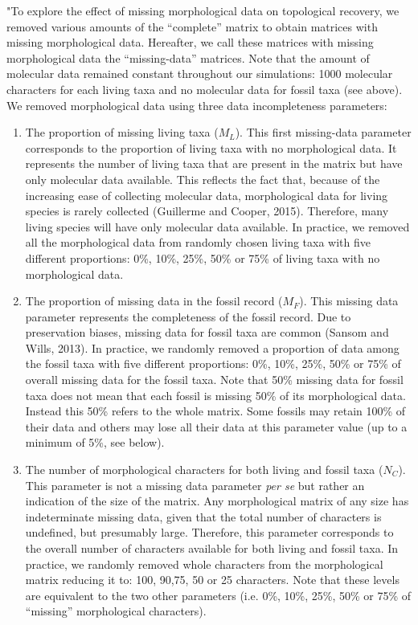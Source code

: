 \documentclass[12pt,letterpaper]{article}
\begin{document}
\begin{enumerate}
"To explore the effect of missing morphological data on topological recovery, we removed various amounts of the ``complete'' matrix to obtain matrices with missing morphological data.
Hereafter, we call these matrices with missing morphological data the ``missing-data'' matrices.
Note that the amount of molecular data remained constant throughout our simulations: 1000 molecular characters for each living taxa and no molecular data for fossil taxa (see above).
We removed morphological data using three data incompleteness parameters:
\begin{enumerate}
\item{The proportion of missing living taxa ($M_L$).} This first missing-data parameter corresponds to the proportion of living taxa with no morphological data. It represents the number of living taxa that are present in the matrix but have only molecular data available. This reflects the fact that, because of the increasing ease of collecting molecular data, morphological data for living species is rarely collected (Guillerme and Cooper, 2015). Therefore, many living species will have only molecular data available. In practice, we removed all the morphological data from randomly chosen living taxa with five different proportions: 0\%, 10\%, 25\%, 50\% or 75\% of living taxa with no morphological data.
\item{The proportion of missing data in the fossil record ($M_F$).} This missing data parameter represents the completeness of the fossil record. Due to preservation biases, missing data for fossil taxa are common (Sansom and Wills, 2013). In practice, we randomly removed a proportion of data among the fossil taxa with five different proportions: 0\%, 10\%, 25\%, 50\% or 75\% of overall missing data for the fossil taxa.
Note that 50\% missing data for fossil taxa does not mean that each fossil is missing 50\% of its morphological data.
Instead this 50\% refers to the whole matrix.
Some fossils may retain 100\% of their data and others may lose all their data at this parameter value (up to a minimum of 5\%, see below).
\item{The number of morphological characters for both living and fossil taxa ($N_C$).} This parameter is not a missing data parameter \textit{per se} but rather an indication of the size of the matrix. Any morphological matrix of any size has indeterminate missing data, given that the total number of characters is undefined, but presumably large. Therefore, this parameter corresponds to the overall number of characters available for both living and fossil taxa. In practice, we randomly removed whole characters from the morphological matrix reducing it to: 100, 90,75, 50 or 25 characters.
Note that these levels are equivalent to the two other parameters (i.e. 0\%, 10\%, 25\%, 50\% or 75\% of ``missing'' morphological characters).
\end{enumerate}


\end{enumerate}
\end{document}
